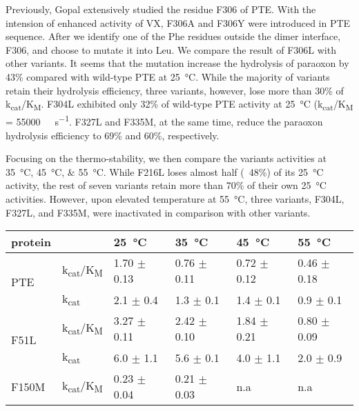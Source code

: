 \begin{refsection}
Previously, Gopal  extensively studied the residue F306 of
PTE.\cite{Gopal2000} With the intension of enhanced activity of VX, F306A and
F306Y were introduced in PTE sequence. After we identify one of the Phe
residues outside the dimer interface, F306,  and choose to mutate it into Leu.
We compare the result of F306L with other variants. It seems that the mutation
increase the hydrolysis of paraoxon by 43\% compared with wild-type PTE at
\SI{25}{\celsius}. While the majority of variants retain their hydrolysis
efficiency, three variants, however, lose more than 30\% of
k\textsubscript{cat}/K\textsubscript{M}. F304L exhibited only 32\% of wild-type
PTE activity at \SI{25}{\celsius} (k\textsubscript{cat}/K\textsubscript{M} =
\SI{55000}{\per\Molar\per\second}. F327L and F335M, at the same time, reduce
the paraoxon hydrolysis efficiency to 69\% and 60\%, respectively.

Focusing on the thermo-stability, we then compare the variants activities at
\SIlist{35;45;55}{\celsius}. While F216L loses almost half (~48\%) of its
\SI{25}{\celsius} activity, the rest of seven variants retain more than 70\% of
their own \SI{25}{\celsius} activities. However, upon elevated temperature at
\SI{55}{\celsius}, three variants, F304L, F327L, and F335M, were inactivated in
comparison with other variants.  

\begin{table}[h!]
\centering
    \begin{tabular}{llllll}
    \hline
    protein                 &  & \SI{25}{\celsius} & \SI{35}{\celsius} &
    \SI{45}{\celsius} & \SI{55}{\celsius} \\ 
    \hline
    \multirow{2}{*}{PTE}    & k\textsubscript{cat}/K\textsubscript{M} & 1.70 $
    \pm$ 0.13 & 0.76 $\pm$ 0.11 & 0.72 $\pm$ 0.12 & 0.46 $\pm$ 0.18 \\
    
    & k\textsubscript{cat} & 2.1 $\pm$ 0.4 & 1.3 $\pm$ 0.1 & 1.4 $\pm$ 0.1 & 0.9
    $\pm$ 0.1 \\
    \multirow{2}{*}{F51L}  & k\textsubscript{cat}/K\textsubscript{M} & 3.27
    $\pm$ 0.11 & 2.42 $\pm$ 0.10 & 1.84 $\pm$ 0.21 & 0.80 $\pm$ 0.09 \\ 
    
    & k\textsubscript{cat} & 6.0 $\pm$ 1.1 & 5.6 $\pm$ 0.1 & 4.0 $\pm$ 1.1 &
    2.0 $\pm$ 0.9 \\
    \multirow{2}{*}{F150M} & k\textsubscript{cat}/K\textsubscript{M} &
    0.23 $\pm$ 0.04 & 0.21 $\pm$ 0.03 & n.a & n.a \\ 
    

\end{tabular}
\end{table}
\end{refsection}
